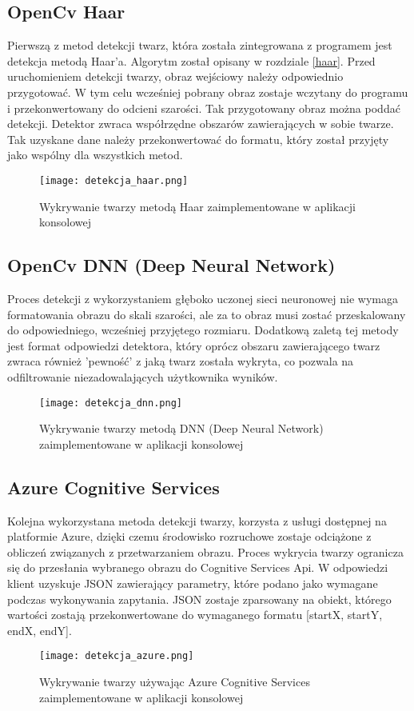 \subsection{OpenCv Haar} \label{detekcja_haar}
Pierwszą z metod detekcji twarz, która została zintegrowana z programem jest detekcja metodą Haar'a. Algorytm został opisany w rozdziale \ref{haar}. Przed uruchomieniem detekcji twarzy, obraz wejściowy należy odpowiednio przygotować. W tym celu wcześniej pobrany obraz zostaje wczytany do programu i przekonwertowany do odcieni szarości. Tak przygotowany obraz można poddać detekcji. Detektor zwraca współrzędne obszarów zawierających w sobie twarze. Tak uzyskane dane należy przekonwertować do formatu, który został przyjęty jako wspólny dla wszystkich metod.
\begin{figure}[H]
	\centering
	\texttt{[image: detekcja\_haar.png]}
	\caption{Wykrywanie twarzy metodą Haar zaimplementowane w aplikacji konsolowej}
	\label{fig:wykrywanie_haar}
\end{figure}

\subsection{OpenCv DNN (Deep Neural Network)} \label{detekcja_dnn}
Proces detekcji z wykorzystaniem głęboko uczonej sieci neuronowej nie wymaga formatowania obrazu do skali szarości, ale za to obraz musi zostać przeskalowany do odpowiedniego, wcześniej przyjętego rozmiaru. Dodatkową zaletą tej metody jest format odpowiedzi detektora, który oprócz obszaru zawierającego twarz zwraca również 'pewność' z jaką twarz została wykryta, co pozwala na odfiltrowanie niezadowalających użytkownika wyników.
\begin{figure}[H]
	\centering
	\texttt{[image: detekcja\_dnn.png]}
	\caption{Wykrywanie twarzy metodą DNN (Deep Neural Network) zaimplementowane w aplikacji konsolowej}
	\label{fig:wykrywanie_dnn}
\end{figure}

\subsection{Azure Cognitive Services} \label{detekcja_azure}
Kolejna wykorzystana metoda detekcji twarzy, korzysta z usługi dostępnej na platformie Azure, dzięki czemu środowisko rozruchowe zostaje odciążone z obliczeń związanych z przetwarzaniem obrazu. Proces wykrycia twarzy ogranicza się do przesłania wybranego obrazu do Cognitive Services Api. W odpowiedzi klient uzyskuje JSON zawierający parametry, które podano jako wymagane podczas wykonywania zapytania. JSON zostaje zparsowany na obiekt, którego wartości zostają przekonwertowane do wymaganego formatu [startX, startY, endX, endY].
\begin{figure}[H]
	\centering
	\texttt{[image: detekcja\_azure.png]}
	\caption{Wykrywanie twarzy używając Azure Cognitive Services zaimplementowane w aplikacji konsolowej}
	\label{fig:wykrywanie_azure}
\end{figure}


